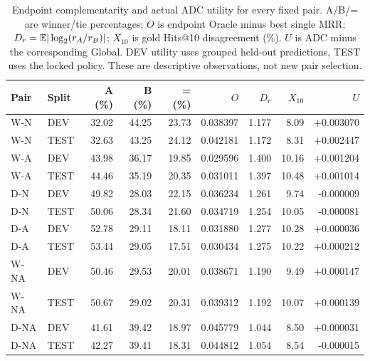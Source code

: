 \begin{table}[htbp]
\centering\footnotesize\setlength{\tabcolsep}{3pt}
\caption{Endpoint complementarity and actual ADC utility for every fixed pair. A/B/= are winner/tie percentages; $O$ is endpoint Oracle minus best single MRR; $D_r=\mathbb{E}|\log_2(r_A/r_B)|$; $X_{10}$ is gold Hits@10 disagreement (\%). $U$ is ADC minus the corresponding Global. DEV utility uses grouped held-out predictions, TEST uses the locked policy. These are descriptive observations, not new pair selection.}
\label{tab:complement-pairs}
\begin{tabular}{llrrrrrrr}
\toprule
Pair & Split & A (\%) & B (\%) & = (\%) & $O$ & $D_r$ & $X_{10}$ & $U$\\
\midrule
W-N & DEV & 32.02 & 44.25 & 23.73 & 0.038397 & 1.177 & 8.09 & +0.003070\\[2pt]
W-N & TEST & 32.63 & 43.25 & 24.12 & 0.042181 & 1.172 & 8.31 & +0.002447\\[2pt]
W-A & DEV & 43.98 & 36.17 & 19.85 & 0.029596 & 1.400 & 10.16 & +0.001204\\[2pt]
W-A & TEST & 44.46 & 35.19 & 20.35 & 0.031011 & 1.397 & 10.48 & +0.001014\\[2pt]
D-N & DEV & 49.82 & 28.03 & 22.15 & 0.036234 & 1.261 & 9.74 & -0.000009\\[2pt]
D-N & TEST & 50.06 & 28.34 & 21.60 & 0.034719 & 1.254 & 10.05 & -0.000081\\[2pt]
D-A & DEV & 52.78 & 29.11 & 18.11 & 0.031880 & 1.277 & 10.28 & +0.000036\\[2pt]
D-A & TEST & 53.44 & 29.05 & 17.51 & 0.030434 & 1.275 & 10.22 & +0.000212\\[2pt]
W-NA & DEV & 50.46 & 29.53 & 20.01 & 0.038671 & 1.190 & 9.49 & +0.000147\\[2pt]
W-NA & TEST & 50.67 & 29.02 & 20.31 & 0.039312 & 1.192 & 10.07 & +0.000139\\[2pt]
D-NA & DEV & 41.61 & 39.42 & 18.97 & 0.045779 & 1.044 & 8.50 & +0.000031\\[2pt]
D-NA & TEST & 42.27 & 39.41 & 18.31 & 0.044812 & 1.054 & 8.54 & -0.000015\\[2pt]
\bottomrule
\end{tabular}
\end{table}
